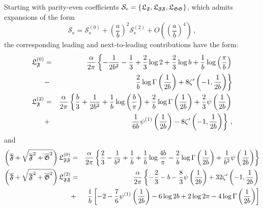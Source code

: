 \documentclass[12pt]{article}
\begin{document}
\begin{appendices}
Starting with parity-even coefficients $\mathcal{S}_{\mathrm{e}}=\left\{ 
\mathfrak{L}_{\mathfrak{F}},\mathfrak{L}_{\mathfrak{FF}},\mathfrak{L}_{%
\mathfrak{GG}}\right\} $, which admits expansions of the form%
\begin{equation}
\mathcal{S}_{\mathrm{e}}=\mathcal{S}_{\mathrm{e}}^{\left( 0\right) }+\left( 
\frac{a}{b}\right) ^{2}\mathcal{S}_{\mathrm{e}}^{\left( 2\right) }+O\left(
\left( \frac{a}{b}\right) ^{4}\right) \,,  \label{PEC}
\end{equation}%
the corresponding leading and next-to-leading contributions have the form:%
\begin{eqnarray}
\mathfrak{L}_{\mathfrak{F}}^{\left( 0\right) } &=&\frac{\alpha }{2\pi }%
\left\{ -\frac{1}{2b^{2}}-\frac{1}{3}+\frac{2}{3}\log 2+\frac{2}{3}\log b+%
\frac{1}{b}\log \left( \frac{\pi }{b}\right) \right.  \notag \\
&-&\left. \frac{2}{b}\log \Gamma \left( \frac{1}{2b}\right) +8\zeta ^{\prime
}\left( -1,\frac{1}{2b}\right) \right\}  \notag \\
\mathfrak{L}_{\mathfrak{F}}^{\left( 2\right) } &=&\frac{\alpha }{2\pi }%
\left\{ \frac{b}{3}+\frac{1}{2b^{2}}+\frac{1}{b}\log \left( \frac{b}{\pi }%
\right) +\frac{2}{b}\log \Gamma \left( \frac{1}{2b}\right) +\frac{2}{3}\psi
\left( \frac{1}{2b}\right) \right.  \notag \\
&+&\left. \frac{1}{6b}\psi ^{\left( 1\right) }\left( \frac{1}{2b}\right)
-8\zeta ^{\prime }\left( -1,\frac{1}{2b}\right) \right\} \,,  \label{apb1}
\end{eqnarray}%
and%
\begin{eqnarray}
\left( \overline{\mathfrak{F}}+\sqrt{\overline{\mathfrak{F}}^{2}+\overline{%
\mathfrak{G}}^{2}}\right) \mathfrak{L}_{\mathfrak{FF}}^{\left( 0\right) } &=&%
\frac{\alpha }{2\pi }\left\{ \frac{2}{3}-\frac{1}{b^{2}}+\frac{1}{b}+\frac{1%
}{b}\log \frac{4b}{\pi }-\frac{2}{b}\log \Gamma \left( \frac{1}{2b}\right) +%
\frac{1}{b^{2}}\psi \left( \frac{1}{2b}\right) \right\}  \notag \\
\left( \overline{\mathfrak{F}}+\sqrt{\overline{\mathfrak{F}}^{2}+\overline{%
\mathfrak{G}}^{2}}\right) \mathfrak{L}_{\mathfrak{FF}}^{\left( 2\right) } &=&%
\frac{\alpha }{2\pi }\left\{ -\frac{2}{3}-b-\frac{8}{3}\psi \left( \frac{1}{%
2b}\right) +32\zeta ^{\prime }\left( -1,\frac{1}{2b}\right) \right.  \notag
\\
&+&\frac{1}{b}\left[ -2-\frac{7}{6}\psi ^{\left( 1\right) }\left( \frac{1}{2b%
}\right) -6\log 2b+2\log 2\pi -4\log \Gamma \left( \frac{1}{2b}\right) %
\right]  \notag \\

\end{eqnarray}
\end{appendices}
\end{document}
